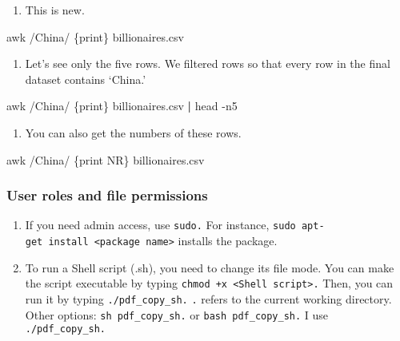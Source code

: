 \documentclass[
]{book}
\newenvironment{Shaded}{\begin{snugshade}}{\end{snugshade}}
\newcommand{\AttributeTok}[1]{\textcolor[rgb]{0.77,0.63,0.00}{#1}}
\newcommand{\FunctionTok}[1]{\textcolor[rgb]{0.00,0.00,0.00}{#1}}
\newcommand{\KeywordTok}[1]{\textcolor[rgb]{0.13,0.29,0.53}{\textbf{#1}}}
\newcommand{\NormalTok}[1]{#1}
\newcommand{\StringTok}[1]{\textcolor[rgb]{0.31,0.60,0.02}{#1}}
\providecommand{\tightlist}{%
  \setlength{\itemsep}{0pt}\setlength{\parskip}{0pt}}
\begin{document}
\begin{enumerate}
\def\labelenumi{\arabic{enumi}.}
\setcounter{enumi}{1}
\tightlist
\item
  This is new.
\end{enumerate}

\begin{Shaded}
\begin{Highlighting}[]
\FunctionTok{awk} \StringTok{\textquotesingle{}/China/ \{print\}\textquotesingle{}}\NormalTok{ billionaires.csv}
\end{Highlighting}
\end{Shaded}

\begin{enumerate}
\def\labelenumi{\arabic{enumi}.}
\setcounter{enumi}{2}
\tightlist
\item
  Let's see only the five rows. We filtered rows so that every row in the final dataset contains `China.'
\end{enumerate}

\begin{Shaded}
\begin{Highlighting}[]
\FunctionTok{awk} \StringTok{\textquotesingle{}/China/ \{print\}\textquotesingle{}}\NormalTok{ billionaires.csv }\KeywordTok{|} \FunctionTok{head} \AttributeTok{{-}n5} 
\end{Highlighting}
\end{Shaded}

\begin{enumerate}
\def\labelenumi{\arabic{enumi}.}
\setcounter{enumi}{3}
\tightlist
\item
  You can also get the numbers of these rows.
\end{enumerate}

\begin{Shaded}
\begin{Highlighting}[]
\FunctionTok{awk} \StringTok{\textquotesingle{}/China/ \{print NR\}\textquotesingle{}}\NormalTok{ billionaires.csv }
\end{Highlighting}
\end{Shaded}

\hypertarget{user-roles-and-file-permissions}{%
\subsubsection{User roles and file permissions}\label{user-roles-and-file-permissions}}

\begin{enumerate}
\def\labelenumi{\arabic{enumi}.}
\item
  If you need admin access, use \texttt{sudo.} For instance, \texttt{sudo\ apt-get\ install\ \textless{}package\ name\textgreater{}} installs the package.
\item
  To run a Shell script (.sh), you need to change its file mode. You can make the script executable by typing \texttt{chmod\ +x\ \textless{}Shell\ script\textgreater{}.} Then, you can run it by typing \texttt{./pdf\_copy\_sh.} \texttt{.} refers to the current working directory. Other options: \texttt{sh\ pdf\_copy\_sh.} or \texttt{bash\ pdf\_copy\_sh.} I use \texttt{./pdf\_copy\_sh.}
\end{enumerate}
\end{document}

